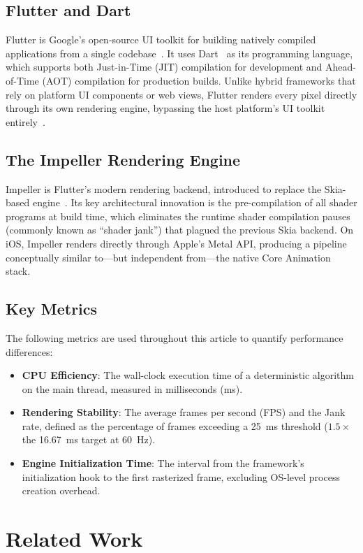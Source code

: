 \documentclass[journal]{IEEEtran}
\begin{document}
\subsection{Flutter and Dart}
Flutter is Google's open-source UI toolkit for building natively compiled applications from a single codebase~\cite{flutter2024}. It uses Dart~\cite{dart2024} as its programming language, which supports both Just-in-Time (JIT) compilation for development and Ahead-of-Time (AOT) compilation for production builds. Unlike hybrid frameworks that rely on platform UI components or web views, Flutter renders every pixel directly through its own rendering engine, bypassing the host platform's UI toolkit entirely~\cite{bjornhansen2018}.

\subsection{The Impeller Rendering Engine}
Impeller is Flutter's modern rendering backend, introduced to replace the Skia-based engine~\cite{impeller2024}. Its key architectural innovation is the pre-compilation of all shader programs at build time, which eliminates the runtime shader compilation pauses (commonly known as ``shader jank'') that plagued the previous Skia backend. On iOS, Impeller renders directly through Apple's Metal API, producing a pipeline conceptually similar to---but independent from---the native Core Animation stack.

\subsection{Key Metrics}
The following metrics are used throughout this article to quantify performance differences:
\begin{itemize}
	\item \textbf{CPU Efficiency}: The wall-clock execution time of a deterministic algorithm on the main thread, measured in milliseconds (ms).
	\item \textbf{Rendering Stability}: The average frames per second (FPS) and the Jank rate, defined as the percentage of frames exceeding a 25~ms threshold ($1.5\times$ the 16.67~ms target at 60~Hz).
	\item \textbf{Engine Initialization Time}: The interval from the framework's initialization hook to the first rasterized frame, excluding OS-level process creation overhead.
\end{itemize}

\section{Related Work}
\end{document}
